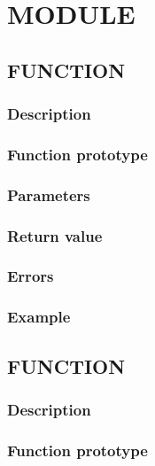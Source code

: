 \section{MODULE}



\subsection{FUNCTION}

\subsubsection*{Description}

\subsubsection*{Function prototype}

\subsubsection*{Parameters}

\subsubsection*{Return value}

\subsubsection*{Errors}

\subsubsection*{Example}


\subsection{FUNCTION}

\subsubsection*{Description}

\subsubsection*{Function prototype}

